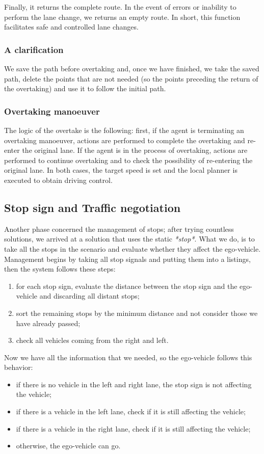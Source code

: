 \documentclass{article}
\begin{document}
Finally, it returns the complete route. In the event of errors or inability to 
perform the lane change, we returns an empty route. In short, this function facilitates safe and 
controlled lane changes.

\subsubsection*{A clarification} We save the path before overtaking and, once we have finished, we take the saved path, 
delete the points that are not needed (so the points preceding the return of the overtaking) and use it
 to follow the initial path.

\subsubsection*{Overtaking manoeuver}
The logic of the overtake is the following:
first, if the agent is terminating an overtaking manoeuver, actions are performed to complete the overtaking and 
re-enter the original lane. If the agent is in the process of overtaking, actions are performed to continue 
overtaking and to check the possibility of re-entering the original lane. In both cases, the target speed 
is set and the local planner is executed to obtain driving control.

\subsection{Stop sign and Traffic negotiation}
Another phase concerned the management of stops; after trying countless solutions, we arrived at a solution that 
uses the static \textit{*stop*}. What we do, is to take all the stops in the scenario and evaluate whether they 
affect the ego-vehicle. 
Management begins by taking all stop signals and putting them into a listings, then the system follows these steps:
\begin{enumerate}
    \item for each stop sign, evaluate the distance between the stop sign and the ego-vehicle and discarding all distant stops;
    \item sort the remaining stops by the minimum distance and not consider those we have already passed;
    \item check all vehicles coming from the right and left.
\end{enumerate}
Now we have all the information that we needed, so the ego-vehicle follows this behavior:
\begin{itemize}
    \item if there is no vehicle in the left and right lane, the stop sign is not affecting the vehicle;
    \item if there is a vehicle in the left lane, check if it is still affecting the vehicle;
    \item if there is a vehicle in the right lane, check if it is still affecting the vehicle;
    \item otherwise, the ego-vehicle can go.
\end{itemize}
\end{document}
